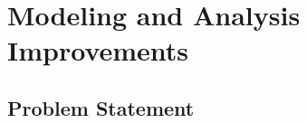 


\section{Modeling and Analysis Improvements}
\label{sec:Improvements}

\subsection{Problem Statement}

